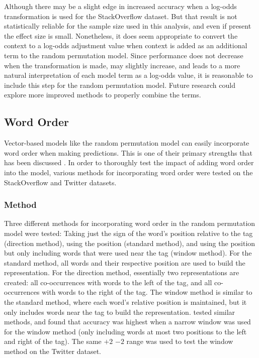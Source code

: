 \documentclass[man,floatsintext,donotrepeattitle]{apa6}
\begin{document}
Although there may be a slight edge in increased accuracy when a log-odds transformation is used for the StackOverflow dataset.
But that result is not statistically reliable for the sample size used in this analysis, and even if present the effect size is small.
Nonetheless, it does seem appropriate to convert the context to a log-odds adjustment value when context is added as an additional term to the random permutation model.
Since performance does not decrease when the transformation is made, may slightly increase,
and leads to a more natural interpretation of each model term as a log-odds value, it is reasonable to include this step for the random permutation model.
Future research could explore more improved methods to properly combine the terms.

\subsection{Word Order}

Vector-based models like the random permutation model can easily incorporate word order when making predictions.
This is one of their primary strengths that has been discussed \parencites{Jones2007, Sahlgren2008}.
In order to thoroughly test the impact of adding word order into the model, various methods for incorporating word order were tested on the StackOverflow and Twitter datasets.

\subsubsection{Method}

Three different methods for incorporating word order in the random permutation model were tested:
Taking just the sign of the word's position relative to the tag (direction method), using the position (standard method), and using the position but only including words that were used near the tag (window method).
For the standard method, all words and their respective position are used to build the representation.
For the direction method, essentially two representations are created: all co-occurrences with words to the left of the tag, and all co-occurrences with words to the right of the tag.
The window method is similar to the standard method, where each word's relative position is maintained, but it only includes words near the tag to build the representation.
\textcite{Sahlgren2008} tested similar methods, and found that accuracy was highest when a narrow window was used for the window method (only including words at most two positions to the left and right of the tag).
The same $+2$ $-2$ range was used to test the window method on the Twitter dataset.
\end{document}
